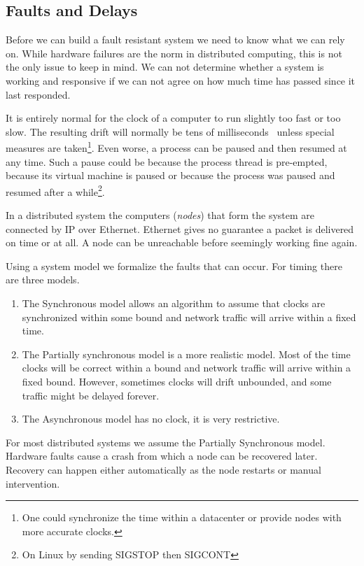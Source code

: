 \subsection{Faults and Delays} \label{sec:faults}
Before we can build a fault resistant system we need to know what we can rely on. While hardware failures are the norm in distributed computing, this is not the only issue to keep in mind. We can not determine whether a system is working and responsive if we can not agree on how much time has passed since it last responded.

It is entirely normal for the clock of a computer to run slightly too fast or too slow. The resulting drift will normally be tens of milliseconds~\cite{time} unless special measures are taken\footnote{One could synchronize the time within a datacenter or provide nodes with more accurate clocks.}. Even worse, a process can be paused and then resumed at any time. Such a pause could be because the process thread is pre-empted, because its virtual machine is paused or because the process was paused and resumed after a while\footnote{On Linux by sending SIGSTOP then SIGCONT}. 

In a distributed system the computers (\textit{nodes}) that form the system are connected by IP over Ethernet. Ethernet gives no guarantee a packet is delivered on time or at all. A node can be unreachable before seemingly working fine again.

Using a system model we formalize the faults that can occur. For timing there are three models. 
\begin{enumerate}
	\item The Synchronous model allows an algorithm to assume that clocks are synchronized within some bound and network traffic will arrive within a fixed time.
	\item The Partially synchronous model is a more realistic model. Most of the time clocks will be correct within a bound and network traffic will arrive within a fixed bound. However, sometimes clocks will drift unbounded, and some traffic might be delayed forever.
	\item The Asynchronous model has no clock, it is very restrictive.
\end{enumerate}

For most distributed systems we assume the Partially Synchronous model. Hardware faults cause a crash from which a node can be recovered later. Recovery can happen either automatically as the node restarts or manual intervention.
